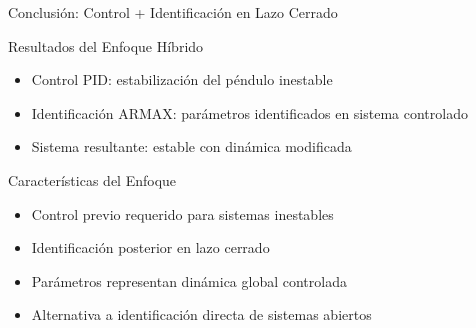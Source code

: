 \documentclass{beamer}
\begin{document}
\begin{frame}{Conclusión: Control + Identificación en Lazo Cerrado}
\begin{block}{Resultados del Enfoque Híbrido}
\begin{itemize}
\item Control PID: estabilización del péndulo inestable
\item Identificación ARMAX: parámetros identificados en sistema controlado
\item Sistema resultante: estable con dinámica modificada
\end{itemize}
\end{block}

\begin{block}{Características del Enfoque}
\begin{itemize}
\item Control previo requerido para sistemas inestables
\item Identificación posterior en lazo cerrado
\item Parámetros representan dinámica global controlada
\item Alternativa a identificación directa de sistemas abiertos
\end{itemize}
\end{block}
\end{frame}
\end{document}
